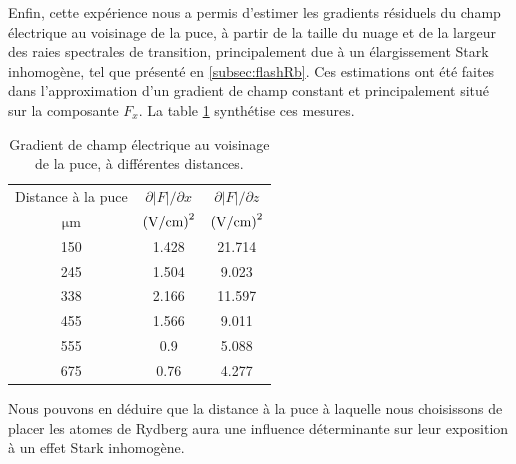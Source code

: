 Enfin, cette expérience nous a permis d'estimer les gradients résiduels du champ électrique au voisinage de la puce, à partir de la taille du nuage et de la largeur des raies spectrales de transition, principalement due à un élargissement Stark inhomogène, tel que présenté en \ref{subsec:flashRb}.
Ces estimations ont été faites dans l'approximation d'un gradient de champ constant et principalement situé sur la composante $F_x$.
La table \ref{tab:fieldGrad} synthétise ces mesures.
%
\begin{table}[!h]
	\centering
	\caption[Estimation des gradients de champ électrique près de la puce]{Gradient de champ électrique au voisinage de la puce, à différentes distances.%
	}
	\label{tab:fieldGrad}
	\begin{tabular}{c c c}
		\toprule\midrule
		Distance à la puce
		& $\partial |F| / \partial x$
		& $\partial |F| / \partial z$\\		
		$\si{\um}$
		& $\si{(\V/\cm)\squared}$
		& $\si{(\V/\cm)\squared}$\\
		\midrule
		\SI{150}{} & \SI{1.428}{} & \SI{21.714}{} \\
		\SI{245}{} & \SI{1.504}{} & \SI{9.023}{} \\
		\SI{338}{} & \SI{2.166}{} & \SI{11.597}{} \\
		\SI{455}{} & \SI{1.566}{} & \SI{9.011}{} \\
		\SI{555}{} & \SI{0.9}{} & \SI{5.088}{} \\
		\SI{675}{} & \SI{0.76}{} & \SI{4.277}{} \\
		\midrule
		\bottomrule
 	\end{tabular}
\end{table}
%

Nous pouvons en déduire que la distance à la puce à laquelle nous choisissons de placer les atomes de Rydberg aura une influence déterminante sur leur exposition à un effet Stark inhomogène.

